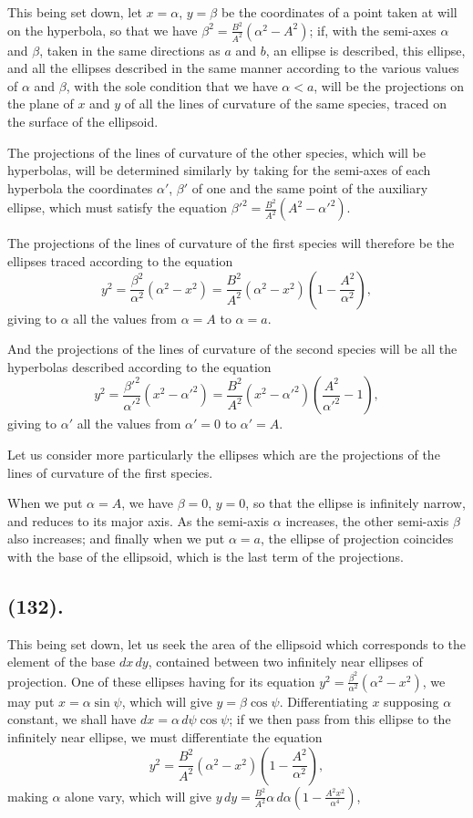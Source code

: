 \documentclass{article}
\begin{document}
This being set down, let $x=\alpha$, $y=\beta$ be the coordinates of a point taken at will on the hyperbola, so that we have $\beta^{2}=\frac{B^{2}}{A^{2}}(\alpha^{2}-A^{2})$; if, with the semi-axes $\alpha$ and $\beta$, taken in the same directions as $a$ and $b$, an ellipse is described, this ellipse, and all the ellipses described in the same manner according to the various values of $\alpha$ and $\beta$, with the sole condition that we have $\alpha<a$, will be the projections on the plane of $x$ and $y$ of all the lines of curvature of the same species, traced on the surface of the ellipsoid.

The projections of the lines of curvature of the other species, which will be hyperbolas, will be determined similarly by taking for the semi-axes of each hyperbola the coordinates $\alpha'$, $\beta'$ of one and the same point of the auxiliary ellipse, which must satisfy the equation $\beta'^{2}=\frac{B^{2}}{A^{2}}(A^{2}-\alpha'^{2})$.

The projections of the lines of curvature of the first species will therefore be the ellipses traced according to the equation
\[ y^{2}=\frac{\beta^{2}}{\alpha^{2}}(\alpha^{2}-x^{2})=\frac{B^{2}}{A^{2}}(\alpha^{2}-x^{2})\left(1-\frac{A^{2}}{\alpha^{2}}\right), \]
giving to $\alpha$ all the values from $\alpha=A$ to $\alpha=a$.

And the projections of the lines of curvature of the second species will be all the hyperbolas described according to the equation
\[ y^{2}=\frac{\beta'^{2}}{\alpha'^{2}}(x^{2}-\alpha'^{2})=\frac{B^{2}}{A^{2}}(x^{2}-\alpha'^{2})\left(\frac{A^{2}}{\alpha'^{2}}-1\right), \]
giving to $\alpha'$ all the values from $\alpha'=0$ to $\alpha'=A$.

Let us consider more particularly the ellipses which are the projections of the lines of curvature of the first species.

When we put $\alpha=A$, we have $\beta=0$, $y=0$, so that the ellipse is infinitely narrow, and reduces to its major axis. As the semi-axis $\alpha$ increases, the other semi-axis $\beta$ also increases; and finally when we put $\alpha=a$, the ellipse of projection coincides with the base of the ellipsoid, which is the last term of the projections.

\subsection*{(132).}

This being set down, let us seek the area of the ellipsoid which corresponds to the element of the base $dx\,dy$, contained between two infinitely near ellipses of projection. One of these ellipses having for its equation $y^{2}=\frac{\beta^{2}}{\alpha^{2}}(\alpha^{2}-x^{2})$, we may put $x=\alpha\sin\psi$, which will give $y=\beta\cos\psi$. Differentiating $x$ supposing $\alpha$ constant, we shall have $dx=\alpha\,d\psi\cos\psi$; if we then pass from this ellipse to the infinitely near ellipse, we must differentiate the equation
\[ y^{2}=\frac{B^{2}}{A^{2}}(\alpha^{2}-x^{2})\left(1-\frac{A^{2}}{\alpha^{2}}\right), \]
making $\alpha$ alone vary, which will give $y\,dy=\frac{B^{2}}{A^{2}}\alpha\,d\alpha\left(1-\frac{A^{2}x^{2}}{\alpha^{4}}\right)$,
\end{document}
